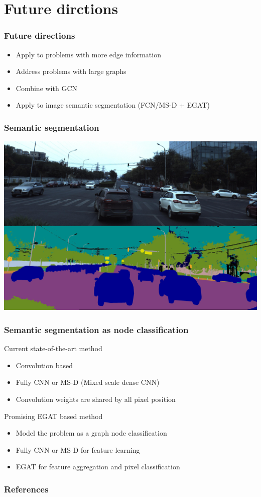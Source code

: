 \documentclass[compress]{beamer}
\begin{document}
\section{Future dirctions}

\begin{frame}
  \frametitle{Future directions}
  \begin{itemize}
  \item Apply to problems with more edge information
  \item Address problems with large graphs
  \item Combine with GCN
  \item Apply to image semantic segmentation (FCN/MS-D + EGAT)
  \end{itemize}
\end{frame}

\begin{frame}
  \frametitle{Semantic segmentation}
  \begin{center}
    \includegraphics[scale=0.08]{semantic_segmentation.jpg}
  \end{center}
\end{frame}

\begin{frame}
  \frametitle{Semantic segmentation as node classification}
  \begin{block}{Current state-of-the-art method}
    \begin{itemize}
    \item Convolution based
    \item Fully CNN or MS-D (Mixed scale dense CNN)
    \item Convolution weights are shared by all pixel position
    \end{itemize}
  \end{block}
  \begin{block}{Promising EGAT based method}
    \begin{itemize}
    \item Model the problem as a graph node classification
    \item Fully CNN or MS-D for feature learning
    \item EGAT for feature aggregation and pixel classification
    \end{itemize}
  \end{block}
\end{frame}

\begin{frame}[allowframebreaks]
  \frametitle{References}
  
  \tiny
  
\end{frame}
\end{document}
